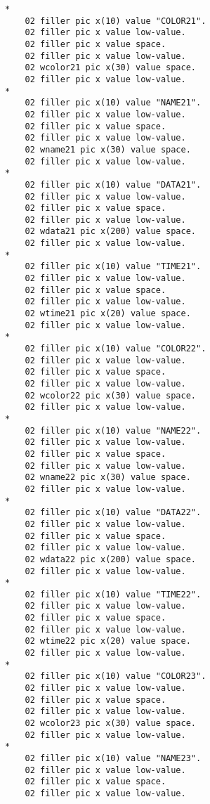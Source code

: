 {{{\begin{verbatim}
      *    
          02 filler pic x(10) value "COLOR21".
          02 filler pic x value low-value.
          02 filler pic x value space.
          02 filler pic x value low-value.
          02 wcolor21 pic x(30) value space.
          02 filler pic x value low-value.
      *    
          02 filler pic x(10) value "NAME21".
          02 filler pic x value low-value.
          02 filler pic x value space.
          02 filler pic x value low-value.
          02 wname21 pic x(30) value space.
          02 filler pic x value low-value.
      *    
          02 filler pic x(10) value "DATA21".
          02 filler pic x value low-value.
          02 filler pic x value space.
          02 filler pic x value low-value.
          02 wdata21 pic x(200) value space.
          02 filler pic x value low-value.
      *    
          02 filler pic x(10) value "TIME21".
          02 filler pic x value low-value.
          02 filler pic x value space.
          02 filler pic x value low-value.
          02 wtime21 pic x(20) value space.
          02 filler pic x value low-value.
      *    
          02 filler pic x(10) value "COLOR22".
          02 filler pic x value low-value.
          02 filler pic x value space.
          02 filler pic x value low-value.
          02 wcolor22 pic x(30) value space.
          02 filler pic x value low-value.
      *    
          02 filler pic x(10) value "NAME22".
          02 filler pic x value low-value.
          02 filler pic x value space.
          02 filler pic x value low-value.
          02 wname22 pic x(30) value space.
          02 filler pic x value low-value.
      *    
          02 filler pic x(10) value "DATA22".
          02 filler pic x value low-value.
          02 filler pic x value space.
          02 filler pic x value low-value.
          02 wdata22 pic x(200) value space.
          02 filler pic x value low-value.
      *    
          02 filler pic x(10) value "TIME22".
          02 filler pic x value low-value.
          02 filler pic x value space.
          02 filler pic x value low-value.
          02 wtime22 pic x(20) value space.
          02 filler pic x value low-value.
      *    
          02 filler pic x(10) value "COLOR23".
          02 filler pic x value low-value.
          02 filler pic x value space.
          02 filler pic x value low-value.
          02 wcolor23 pic x(30) value space.
          02 filler pic x value low-value.
      *    
          02 filler pic x(10) value "NAME23".
          02 filler pic x value low-value.
          02 filler pic x value space.
          02 filler pic x value low-value.

\end{verbatim}}}}
